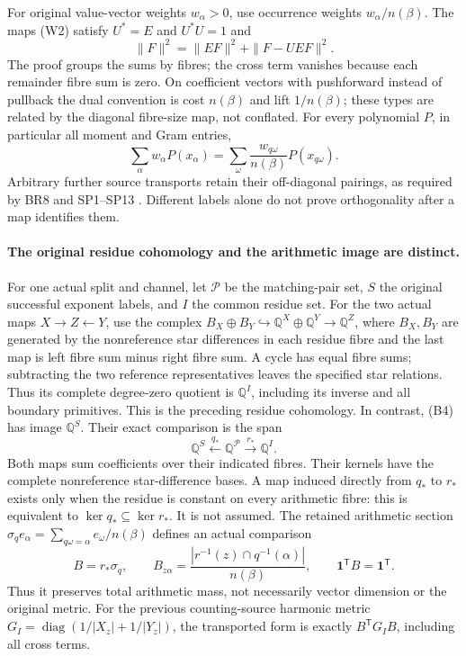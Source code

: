 For original value-vector weights $w_\alpha>0$, use occurrence weights
$w_\alpha/n(\beta)$. The maps (W2) satisfy $U^*=E$ and $U^*U=1$ and
\[
 \|F\|^2=\|EF\|^2+\|F-UEF\|^2.
 \tag{W3}
\]
The proof groups the sums by fibres; the cross term vanishes because each
remainder fibre sum is zero. On coefficient vectors with pushforward instead
of pullback the dual convention is cost $n(\beta)$ and lift $1/n(\beta)$;
these types are related by the diagonal fibre-size map, not conflated.
For every polynomial $P$, in particular all moment and Gram entries,
\[
 \sum_\alpha w_\alpha P(x_\alpha)
 =\sum_\omega\frac{w_{q\omega}}{n(\beta)}P(x_{q\omega}).
 \tag{W4}
\]
Arbitrary further source transports retain their off-diagonal pairings, as
required by BR8 and SP1--SP13 \cite{SZ30,SP}. Different labels alone do not
prove orthogonality after a map identifies them.

\paragraph{The original residue cohomology and the arithmetic image are distinct.}
For one actual split and channel, let $\mathscr P$ be the matching-pair set,
$S$ the original successful exponent labels, and $I$ the common residue set.
For the two actual maps $X\to Z\leftarrow Y$, use the complex
$B_X\oplus B_Y\hookrightarrow\mathbb Q^X\oplus\mathbb Q^Y\to\mathbb Q^Z$,
where $B_X,B_Y$ are generated by the nonreference star differences in each
residue fibre and the last map is left fibre sum minus right fibre sum.
A cycle has equal fibre sums; subtracting the two reference representatives
leaves the specified star relations. Thus its complete degree-zero quotient
is $\mathbb Q^I$, including its inverse and all boundary primitives.
This is the preceding residue cohomology. In contrast, (B4)
has image $\mathbb Q^S$. Their exact comparison is the span
\[
 \mathbb Q^S\xleftarrow{q_*}\mathbb Q^{\mathscr P}
 \xrightarrow{r_*}\mathbb Q^I.
 \tag{W5}
\]
Both maps sum coefficients over their indicated fibres. Their kernels have
the complete nonreference star-difference bases. A map induced directly from
$q_*$ to $r_*$ exists only when the residue is constant on every arithmetic
fibre: this is equivalent to $\ker q_*\subseteq\ker r_*$. It is not assumed.
The retained arithmetic section $\sigma_q e_\alpha=
\sum_{q\omega=\alpha}e_\omega/n(\beta)$ defines an actual comparison
\[
 B=r_*\sigma_q,\qquad B_{z\alpha}=
 \frac{|r^{-1}(z)\cap q^{-1}(\alpha)|}{n(\beta)},\qquad
 \mathbf1^{\mathsf T}B=\mathbf1^{\mathsf T}.
 \tag{W6}
\]
Thus it preserves total arithmetic mass, not necessarily vector dimension
or the original metric. For the previous counting-source harmonic metric
$G_I=\operatorname{diag}(1/|X_z|+1/|Y_z|)$, the transported form is exactly
$B^{\mathsf T}G_IB$, including all cross terms.

